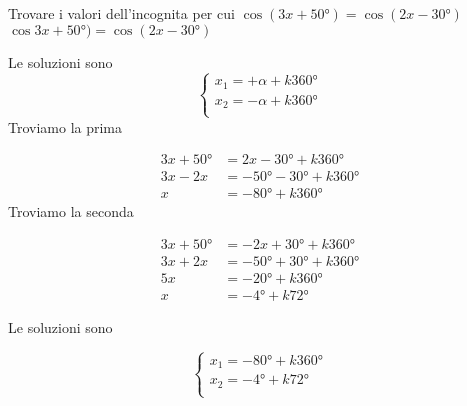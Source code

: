 \begin{exercise}
	Trovare i valori dell'incognita per cui $\cos(3x+\ang{50;;} )=\cos(2x -\ang{30;;})$
	\tcblower
	$\cos3x+\ang{50;;} )=\cos(2x -\ang{30;;})$
	
	Le soluzioni sono 
	\[\begin{cases}
	x_1=+\alpha+k\ang{360;;}\\
	x_2=-\alpha+k\ang{360;;}\\
	\end{cases}\]
	Troviamo la prima
	
	\begin{align*}
	3x+\ang{50;;}&=2x-\ang{30;;}+k\ang{360;;}\\
	3x-2x&=-\ang{50;;}-\ang{30;;}+k\ang{360;;}\\
	x&=-\ang{80;;}+k\ang{360;;}
	\end{align*}
    Troviamo la seconda
	
	\begin{align*}
	3x+\ang{50;;}&=-2x+\ang{30;;}+k\ang{360;;}\\
	3x+2x&=-\ang{50;;}+\ang{30;;}+k\ang{360;;}\\
	5x&=-\ang{20;;}+k\ang{360;;}\\
    x&=-\ang{4;;}+k\ang{72;;}
	\end{align*}
	
	Le soluzioni sono
	
	\[\begin{cases}
	x_1=-\ang{80;;}+k\ang{360;;}\\
	x_2=-\ang{4;;}+k\ang{72;;}\\
	\end{cases}\]
\end{exercise}
